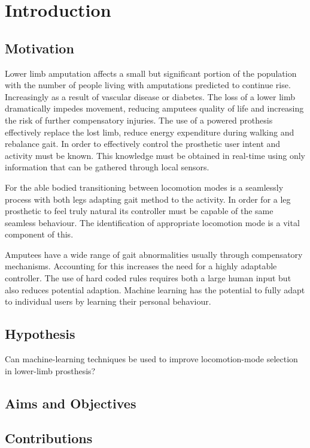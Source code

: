 \chapter{Introduction}
\label{chp:intro}

\section{Motivation}
Lower limb amputation affects a small but significant portion of the population with the number of people living with amputations predicted to continue rise. Increasingly as a result of vascular disease or diabetes\cite{Griffin2012}.%
The loss of a lower limb dramatically impedes movement\cite{Gregg2014}, reducing amputees quality of life and increasing the risk of further compensatory injuries. The use of a powered prothesis effectively replace the lost limb, reduce energy expenditure during walking and rebalance gait\cite{Lin2014}. In order to effectively control the prosthetic user intent and activity must be known. This knowledge must be obtained in real-time using only information that can be gathered through local sensors.

For the able bodied transitioning between locomotion modes is a seamlessly process with both legs adapting gait method to the activity. In order for a leg prosthetic to feel truly natural its controller must be capable of the same seamless behaviour. The identification of appropriate locomotion mode is a vital component of this. 

Amputees have a wide range of gait abnormalities usually through compensatory mechanisms\cite{Tucker2015}. Accounting for this increases the need for a highly adaptable controller. The use of hard coded rules requires both a large human input but also reduces potential adaption. Machine learning has the potential to fully adapt to individual users by learning their personal behaviour.

\section{Hypothesis}
Can machine-learning techniques be used to improve locomotion-mode selection in lower-limb prosthesis?


\section{Aims and Objectives}


\section{Contributions}